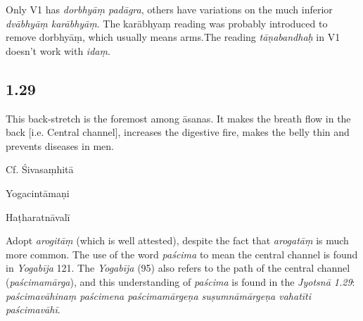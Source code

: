 \begin{ekdosis}
\begin{philcomm}[hp01_028]
Only V1 has \emph{dorbhyāṃ padāgra}, others have variations on the much inferior \emph{dvābhyāṃ karābhyāṃ}. The karābhyaṃ reading was probably introduced to remove dorbhyāṃ, which usually means arms.The reading \emph{tāṇabandhaḥ} in V1 doesn’t work with \emph{idaṃ}.
\end{philcomm}

\subsection*{1.29}
\begin{translation}[hp01_029]
This back-stretch is the foremost among āsanas. It makes the breath flow in the back [i.e. Central channel], increases the digestive fire, makes the belly thin and prevents diseases in men.
\end{translation}

\begin{sources}[hp01_029]
Cf. Śivasaṃhitā

\begin{versinnote}
\end{versinnote}

\end{sources}

\begin{testimonia}[hp01_029]
Yogacintāmaṇi

\begin{versinnote}
\end{versinnote}

Haṭharatnāvalī

\begin{versinnote}
\end{versinnote}

\end{testimonia}

\begin{philcomm}[hp01_029]
Adopt \emph{arogitāṃ} (which is well attested), despite the fact that \emph{arogatāṃ} is much more common. The use of the word \emph{paścima} to mean the central channel is found in \emph{Yogabīja} 121. The  \emph{Yogabīja} (95) also refers to the path of the central channel (\emph{paścimamārga}), and this understanding of \emph{paścima} is found in the \emph{Jyotsnā 1.29}: \emph{paścimavāhinaṃ paścimena paścimamārgeṇa suṣumnāmārgeṇa vahatīti paścimavāhī}.
\end{philcomm}


\end{ekdosis}
